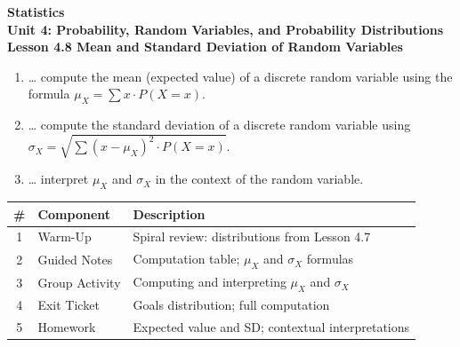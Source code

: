 \documentclass[10pt]{article}
\begin{document}
\vspace{-0.8in}

\begin{center}
  {\color{white}\textbf{\LARGE Statistics}}\\[4pt]
  {\color{skymid}\large\textbf{Unit 4: Probability, Random Variables, and Probability Distributions}}\\[6pt]
  {\color{white}\textbf{\large Lesson 4.8 \quad Mean and Standard Deviation of Random Variables}}
\end{center}

\vspace{0.22in}
\namedateperiod
\vspace{0.18in}

\begin{learningtargetbox}
\small
\begin{enumerate}[leftmargin=1.5em, itemsep=5pt]
  \item \ldots{} compute the mean (expected value) of a discrete random variable using
        the formula $\mu_X = \sum x \cdot P(X=x)$.
  \item \ldots{} compute the standard deviation of a discrete random variable using
        $\sigma_X = \sqrt{\sum (x-\mu_X)^2 \cdot P(X=x)}$.
  \item \ldots{} interpret $\mu_X$ and $\sigma_X$ in the context of the random variable.
\end{enumerate}
\end{learningtargetbox}

\vspace{0.14in}

\begin{tocbox}
\small
\renewcommand{\arraystretch}{1.5}
\begin{tabularx}{\linewidth}{@{} c l X @{}}
\rowcolor{sky}
\textbf{\#} & \textbf{Component} & \textbf{Description} \\
\midrule
1 & Warm-Up        & Spiral review: distributions from Lesson 4.7 \\
2 & Guided Notes   & Computation table; $\mu_X$ and $\sigma_X$ formulas \\
3 & Group Activity & Computing and interpreting $\mu_X$ and $\sigma_X$ \\
4 & Exit Ticket    & Goals distribution; full computation \\
5 & Homework       & Expected value and SD; contextual interpretations \\
\end{tabularx}
\end{tocbox}
\end{document}
